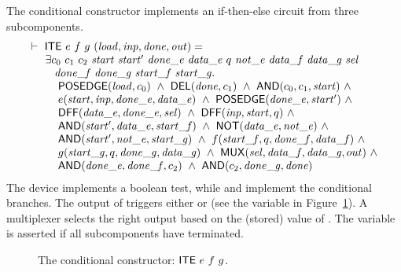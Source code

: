 The conditional constructor  implements an if-then-else
circuit from three subcomponents.
\[
\begin{array}{l}
\TURNST\ \DEF{ITE}\ e\ f\ g\ (\VAR{load,inp,done,out}) =\\
\phantom{\TURNST\ ~}
   \exists c_0~c_1~c_2~\VAR{start}~\VAR{start'}~\VAR{done\_e}~\VAR{data\_e}~q~ 
                          \VAR{not\_e}~\VAR{data\_f}~\VAR{data\_g}~\VAR{sel}\\
\phantom{\TURNST\ ~\exists }
                  \VAR{done\_f}~\VAR{done\_g}~
                          \VAR{start\_f}~\VAR{start\_g}.\ \\
\phantom{\TURNST\ ~\exists ~}
           \DEF{POSEDGE} (\VAR{load},c_0)\ \AND\
           \DEF{DEL} (\VAR{done},c_1)\ \AND\ \DEF{AND} (c_0,c_1,\VAR{start})\ \AND \\
\phantom{\TURNST\ ~\exists ~}
           e (\VAR{start},\VAR{inp},\VAR{done\_e},\VAR{data\_e})\ \AND\
           \DEF{POSEDGE} (\VAR{done\_e},\VAR{start'})\ \AND \\
\phantom{\TURNST\ ~\exists ~}
           \DEF{DFF} (\VAR{data\_e},\VAR{done\_e},\VAR{sel})\ \AND\
           \DEF{DFF} (\VAR{inp},\VAR{start},q)\ \AND \\
\phantom{\TURNST\ ~\exists ~}
           \DEF{AND} (\VAR{start'},\VAR{data\_e},\VAR{start\_f})\ \AND\
           \DEF{NOT} (\VAR{data\_e},\VAR{not\_e})\ \AND \\
\phantom{\TURNST\ ~\exists ~}
           \DEF{AND} (\VAR{start'},\VAR{not\_e},\VAR{start\_g})\ \AND\
           f (\VAR{start\_f},q,\VAR{done\_f},\VAR{data\_f})\ \AND\\
\phantom{\TURNST\ ~\exists ~}
           g (\VAR{start\_g},q,\VAR{done\_g},\VAR{data\_g})\ \AND\
           \DEF{MUX} (\VAR{sel},\VAR{data\_f},\VAR{data\_g},out)\ \AND \\
\phantom{\TURNST\ ~\exists ~}
           \DEF{AND} (\VAR{done\_e},\VAR{done\_f},c_2)\ \AND\
           \DEF{AND} (c_2,\VAR{done\_g},\VAR{done}) 
\end{array}
\]
The device \VAR{e} implements a boolean test, while
 and  implement the conditional branches.
The output of \VAR{e} triggers either \VAR{f} or \VAR{g}
(see the variable  in Figure~\ref{figIf}).
A multiplexer selects the right output based on the
(stored) value of \VAR{data\_e}.
The variable  is asserted if all subcomponents
have terminated.

\begin{figure}[htb]
   \centerline{}
   \caption{\label{figIf}The conditional constructor: $\DEF{ITE}\ e\ f\ g$.}
\end{figure}

